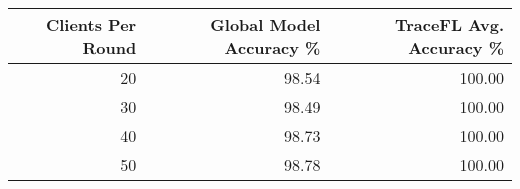 \begin{tabular}{rrr}
\toprule
Clients Per Round & Global Model Accuracy \% & TraceFL Avg. Accuracy \% \\
\midrule
20 & 98.54 & 100.00 \\
30 & 98.49 & 100.00 \\
40 & 98.73 & 100.00 \\
50 & 98.78 & 100.00 \\
\bottomrule
\end{tabular}
